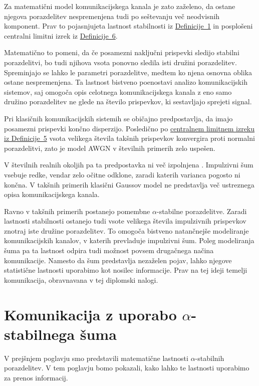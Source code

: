 \documentclass[a4paper, 12pt, openany]{book}
\begin{document}
Za matematični model komunikacijskega kanala je zato zaželeno, da ostane njegova porazdelitev nespremenjena tudi po seštevanju več neodvisnih komponent. Prav to pojasnjujeta lastnost stabilnosti iz \hyperref[def:stable]{Definicije~1} in posplošeni centralni limitni izrek iz \hyperref[def:GCLI]{Definicije~6}.

Matematično to pomeni, da če posamezni naključni prispevki sledijo stabilni porazdelitvi, bo tudi njihova vsota ponovno sledila isti družini porazdelitev. Spreminjajo se lahko le parametri porazdelitve, medtem ko njena osnovna oblika ostane nespremenjena. Ta lastnost bistveno poenostavi analizo komunikacijskih sistemov, saj omogoča opis celotnega komunikacijskega kanala z eno samo družino porazdelitev ne glede na število prispevkov, ki sestavljajo sprejeti signal.

Pri klasičnih komunikacijskih sistemih se običajno predpostavlja, da imajo posamezni prispevki končno disperzijo. Posledično po \hyperref[def:CLI]{centralnem limitnem izreku iz Definicije~5} vsota velikega števila takšnih prispevkov konvergira proti normalni porazdelitvi, zato je model AWGN v številnih primerih zelo uspešen.

V številnih realnih okoljih pa ta predpostavka ni več izpolnjena \cite{madi2011impacts}. Impulzivni šum vsebuje redke, vendar zelo očitne odklone, zaradi katerih varianca pogosto ni končna. V takšnih primerih klasični Gaussov model ne predstavlja več ustreznega opisa komunikacijskega kanala.

Ravno v takšnih primerih postanejo pomembne $\alpha$-stabilne porazdelitve. Zaradi lastnosti stabilnosti ostanejo tudi vsote velikega števila impulzivnih prispevkov znotraj iste družine porazdelitev. To omogoča bistveno natančnejše modeliranje komunikacijskih kanalov, v katerih prevladuje impulzivni šum.
Poleg modeliranja šuma pa ta lastnost odpira tudi možnost povsem drugačnega načina komunikacije. Namesto da šum predstavlja nezaželen pojav, lahko njegove statistične lastnosti uporabimo kot nosilec informacije. Prav na tej ideji temelji komunikacija, obravnavana v tej diplomski nalogi.



\chapter{Komunikacija z uporabo $\alpha$-stabilnega šuma}
V prejšnjem poglavju smo predstavili matematične lastnosti $\alpha$-stabilnih porazdelitev. V tem poglavju bomo pokazali, kako lahko te lastnosti uporabimo za prenos informacij.
\end{document}
